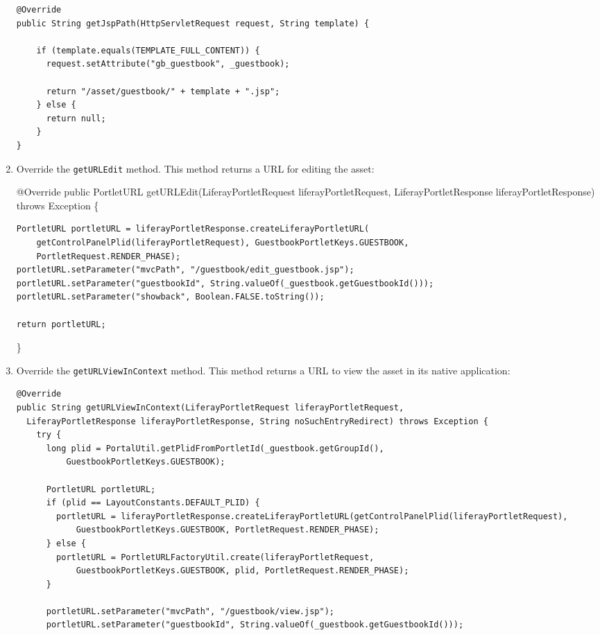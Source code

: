 \begin{enumerate}
\begin{verbatim}
@Override
public String getJspPath(HttpServletRequest request, String template) {

    if (template.equals(TEMPLATE_FULL_CONTENT)) {
      request.setAttribute("gb_guestbook", _guestbook);

      return "/asset/guestbook/" + template + ".jsp";
    } else {
      return null;
    }
}
\end{verbatim}
\item
  Override the \texttt{getURLEdit} method. This method returns a URL for
  editing the asset:

  @Override public PortletURL getURLEdit(LiferayPortletRequest
  liferayPortletRequest, LiferayPortletResponse liferayPortletResponse)
  throws Exception \{

\begin{verbatim}
PortletURL portletURL = liferayPortletResponse.createLiferayPortletURL(
    getControlPanelPlid(liferayPortletRequest), GuestbookPortletKeys.GUESTBOOK,
    PortletRequest.RENDER_PHASE);
portletURL.setParameter("mvcPath", "/guestbook/edit_guestbook.jsp");
portletURL.setParameter("guestbookId", String.valueOf(_guestbook.getGuestbookId()));
portletURL.setParameter("showback", Boolean.FALSE.toString());

return portletURL;
\end{verbatim}

  \}
\item
  Override the \texttt{getURLViewInContext} method. This method returns
  a URL to view the asset in its native application:

\begin{verbatim}
@Override
public String getURLViewInContext(LiferayPortletRequest liferayPortletRequest,
  LiferayPortletResponse liferayPortletResponse, String noSuchEntryRedirect) throws Exception {
    try {
      long plid = PortalUtil.getPlidFromPortletId(_guestbook.getGroupId(),
          GuestbookPortletKeys.GUESTBOOK);

      PortletURL portletURL;
      if (plid == LayoutConstants.DEFAULT_PLID) {
        portletURL = liferayPortletResponse.createLiferayPortletURL(getControlPanelPlid(liferayPortletRequest),
            GuestbookPortletKeys.GUESTBOOK, PortletRequest.RENDER_PHASE);
      } else {
        portletURL = PortletURLFactoryUtil.create(liferayPortletRequest,
            GuestbookPortletKeys.GUESTBOOK, plid, PortletRequest.RENDER_PHASE);
      }

      portletURL.setParameter("mvcPath", "/guestbook/view.jsp");
      portletURL.setParameter("guestbookId", String.valueOf(_guestbook.getGuestbookId()));


\end{verbatim}
\end{enumerate}
